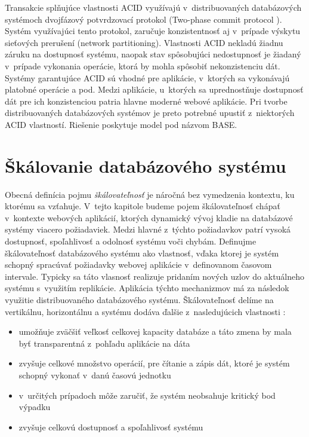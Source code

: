 \documentclass[11pt,twoside,a4paper]{book}
\begin{document}
Transakcie splňujúce vlastnosti ACID využívajú v~distribuovaných databázových systémoch dvojfázový potvrdzovací protokol (Two-phase commit protocol \cite{bernstein1987concurrency}). Systém využívajúci tento protokol, zaručuje konzistentnosť aj v~prípade výskytu sieťových prerušení (network partitioning). Vlastnosti ACID nekladú žiadnu záruku na dostupnosť systému, naopak stav spôsobujúci nedostupnosť je žiadaný v~prípade vykonania operácie, ktorá by mohla spôsobiť nekonzistenciu dát. Systémy garantujúce ACID sú vhodné pre aplikácie, v~ktorých sa vykonávajú platobné operácie a pod. Medzi aplikácie, u~ktorých sa uprednostňuje dostupnosť dát pre ich konzistenciou patria hlavne moderné webové aplikácie. Pri tvorbe distribuovaných databázových systémov je preto potrebné upustiť z~niektorých ACID vlastností. Riešenie poskytuje model pod názvom BASE.


\section{Škálovanie databázového systému} %
Obecná definícia pojmu \emph{škálovateľnosť} \cite{bondi2000characteristics} je náročná  bez vymedzenia kontextu, ku ktorému sa vzťahuje. V~tejto kapitole budeme pojem škálovateľnosť chápať v~kontexte webových aplikácií, ktorých dynamický vývoj kladie na databázové systémy viacero požiadaviek. Medzi hlavné z~týchto požiadavkov patrí vysoká dostupnosť, spoľahlivosť a odolnosť systému voči chybám. Definujme škálovateľnosť databázového systému ako vlastnosť, vďaka ktorej je systém schopný spracúvať požiadavky webovej aplikácie v~definovanom časovom intervale. Typicky sa táto vlasnosť realizuje pridaním nových uzlov do aktuálneho systému s~využitím replikácie. Aplikácia týchto mechanizmov má za následok využitie distribuovaného databázového systému. Škálovateľnosť delíme na vertikálnu, horizontálnu a systému dodáva ďalšie z~nasledujúcich vlastnosti \cite{hewitt2010cassandra}:
\begin{itemize}
 \item umožňuje zväčšiť veľkosť celkovej kapacity databáze a táto zmena by mala byť transparentná z~pohľadu aplikácie na dáta
  \item zvyšuje celkové množstvo operácií, pre čítanie a zápis dát, ktoré je systém schopný vykonať v~danú časovú jednotku
  \item v~určitých prípadoch môže zaručiť, že systém neobsahuje kritický bod výpadku
  \item zvyšuje celkovú dostupnosť a spoľahlivosť systému
\end{itemize}
\end{document}
